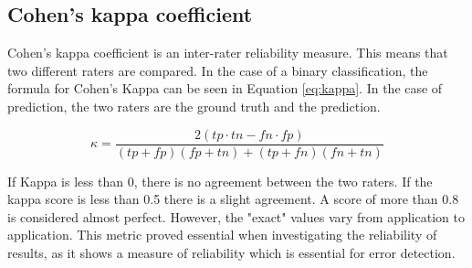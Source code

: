 \subsection{Cohen's kappa coefficient}

Cohen's kappa coefficient is an inter-rater reliability measure\cite{kappa}. This means that two different raters are compared. In the case of a binary classification, the formula for Cohen's Kappa can be seen in Equation \ref{eq:kappa}. In the case of prediction, the two raters are the ground truth and the prediction.

\begin{equation}
    \label{eq:kappa}
    \kappa = \frac{2(tp \cdot tn - fn \cdot fp)}{(tp + fp)(fp + tn) + (tp + fn)(fn + tn)}
\end{equation}

If Kappa is less than 0, there is no agreement between the two raters. If the kappa score is less than 0.5 there is a slight agreement. A score of more than 0.8 is considered almost perfect. However, the "exact" values vary from application to application. This metric proved essential when investigating the reliability of results, as it shows a measure of reliability which is essential for error detection.